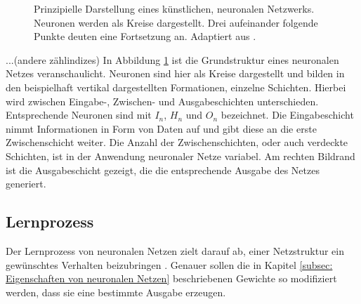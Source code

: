 \begin{figure}[H]
				\caption{Prinzipielle Darstellung eines künstlichen, neuronalen Netzwerks. Neuronen werden als Kreise dargestellt. Drei aufeinander folgende Punkte deuten eine Fortsetzung an. Adaptiert aus \cite{neuron}.}
				\label{fig: neuronales netz }
		\end{figure}
	
		...(andere zählindizes)
		In Abbildung \ref{fig: neuronales netz } ist die Grundstruktur eines neuronalen Netzes veranschaulicht. Neuronen sind hier als Kreise dargestellt und bilden in den beispielhaft vertikal dargestellten Formationen, einzelne Schichten. Hierbei wird zwischen Eingabe-, Zwischen- und Ausgabeschichten unterschieden. Entsprechende Neuronen sind mit $I_n$, $H_n$ und $O_n$ bezeichnet. Die Eingabeschicht nimmt Informationen in Form von Daten auf und gibt diese an die erste Zwischenschicht weiter. Die Anzahl der Zwischenschichten, oder auch verdeckte Schichten, ist in der Anwendung neuronaler Netze variabel. Am rechten Bildrand ist die Ausgabeschicht gezeigt, die die entsprechende Ausgabe des Netzes generiert.  
	
		\subsection{Lernprozess}
		Der Lernprozess von neuronalen Netzen zielt darauf ab, einer Netzstruktur ein gewünschtes Verhalten beizubringen \cite{proba}. Genauer sollen die in Kapitel \ref{subsec: Eigenschaften von neuronalen Netzen} beschriebenen Gewichte so modifiziert werden, dass sie eine bestimmte Ausgabe erzeugen.\\
		
